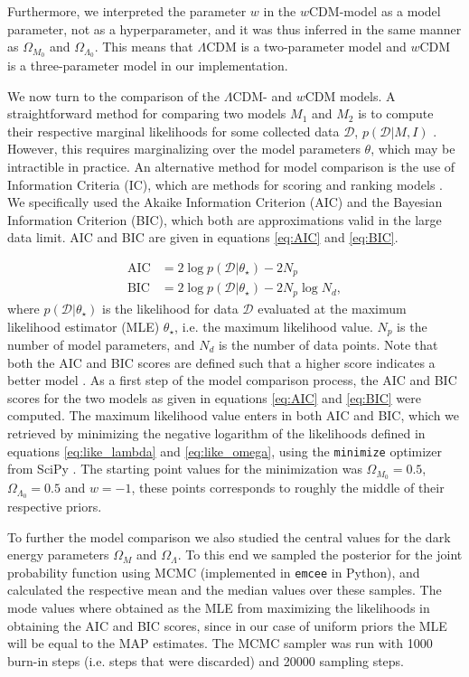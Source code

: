 \documentclass[11pt,a4paper]{article}
\begin{document}
Furthermore, we interpreted the parameter $w$ in the $w$CDM-model as a model parameter, not as a hyperparameter, and it was thus inferred in the same manner as $\Omega_{M_0}$ and $\Omega_{\Lambda_0}$. This means that $\Lambda$CDM is a two-parameter model and $w$CDM is a three-parameter model in our implementation.

We now turn to the comparison of the $\Lambda$CDM- and $w$CDM models. A straightforward method for comparing two models $M_1$ and $M_2$ is to compute their respective marginal likelihoods for some collected data $\mathcal{D}$, $p\left(\mathcal{D} \vert M, I \right)$ \cite{lec3}. However, this requires marginalizing over the model parameters $\theta$, which may be intractible in practice. An alternative method for model comparison is the use of Information Criteria (IC), which are methods for scoring and ranking models \cite{lec3}. We specifically used the Akaike Information Criterion (AIC) and the Bayesian Information Criterion (BIC), which both are approximations valid in the large data limit. AIC and BIC are given in equations \eqref{eq:AIC} and \eqref{eq:BIC}. 

\begin{align}
    \label{eq:AIC}
    \text{AIC} &= 2 \log{p\left(\mathcal{D} \vert \theta_{\star} \right)} - 2N_p \\
    \label{eq:BIC}
    \text{BIC} &= 2 \log{p\left(\mathcal{D} \vert \theta_{\star} \right)} - 2N_p \log{N_d},
\end{align}
where $p\left(\mathcal{D} \vert \theta_{\star} \right)$ is the likelihood for data $\mathcal{D}$ evaluated at the maximum likelihood estimator (MLE) $\theta_\star$, i.e. the maximum likelihood value. $N_p$ is the number of model parameters, and $N_d$ is the number of data points. Note that both the AIC and BIC scores are defined such that a higher score indicates a better model \cite{lec3}. As a first step of the model comparison process, the AIC and BIC scores for the two models as given in equations \eqref{eq:AIC} and \eqref{eq:BIC} were computed. The maximum likelihood value enters in both AIC and BIC, which we retrieved by minimizing the negative logarithm of the likelihoods defined in equations \eqref{eq:like_lambda} and \eqref{eq:like_omega}, using the \texttt{minimize} optimizer from SciPy \cite{scipy_min}. The starting point values for the minimization was $\Omega_{M_0}=0.5$, $\Omega_{\Lambda_0}=0.5$ and $w=-1$, these points corresponds to roughly the middle of their respective priors. 

To further the model comparison we also studied the central values for the dark energy parameters $\Omega_M$ and $\Omega_\Lambda$. To this end we sampled the posterior for the joint probability function using MCMC (implemented in \texttt{emcee} in Python), and calculated the respective mean and the median values over these samples. The mode values where obtained as the MLE from maximizing the likelihoods in obtaining the AIC and BIC scores, since in our case of uniform priors the MLE will be equal to the MAP estimates. The MCMC sampler was run with 1000 burn-in steps (i.e. steps that were discarded) and 20000 sampling steps. 
\end{document}
